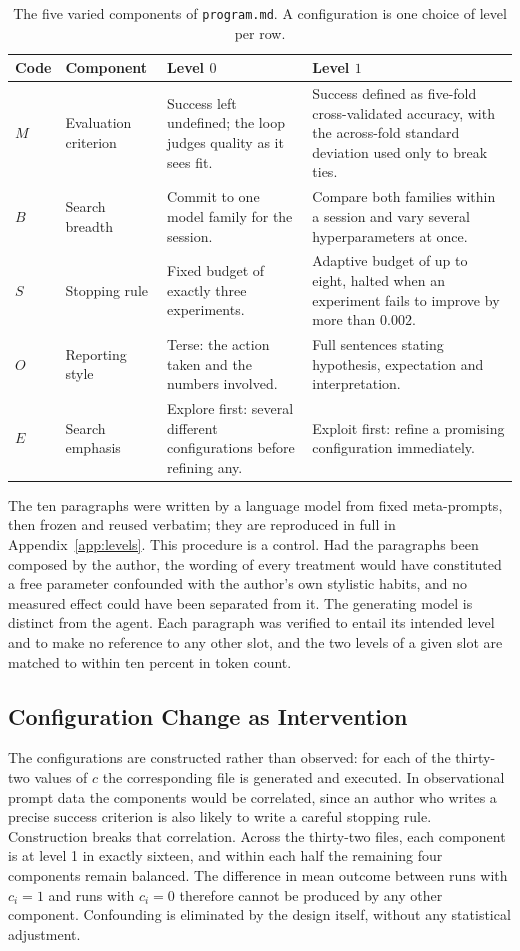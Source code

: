 \documentclass[11pt]{article}
\begin{document}
\begin{table}[t]
\centering
\small
\caption{The five varied components of \texttt{program.md}. A configuration is one choice of level per row.}
\label{tab:axes}
\begin{tabular}{p{0.8cm}p{2.1cm}p{4.6cm}p{4.6cm}}
\toprule
Code & Component & Level $0$ & Level $1$ \\
\midrule
$M$ & Evaluation criterion & Success left undefined; the loop judges quality as it sees fit. & Success defined as five-fold cross-validated accuracy, with the across-fold standard deviation used only to break ties. \\
$B$ & Search breadth & Commit to one model family for the session. & Compare both families within a session and vary several hyperparameters at once. \\
$S$ & Stopping rule & Fixed budget of exactly three experiments. & Adaptive budget of up to eight, halted when an experiment fails to improve by more than $0.002$. \\
$O$ & Reporting style & Terse: the action taken and the numbers involved. & Full sentences stating hypothesis, expectation and interpretation. \\
$E$ & Search emphasis & Explore first: several different configurations before refining any. & Exploit first: refine a promising configuration immediately. \\
\bottomrule
\end{tabular}
\end{table}

The ten paragraphs were written by a language model from fixed meta-prompts, then frozen and reused verbatim; they are reproduced in full in Appendix~\ref{app:levels}. This procedure is a control. Had the paragraphs been composed by the author, the wording of every treatment would have constituted a free parameter confounded with the author's own stylistic habits, and no measured effect could have been separated from it. The generating model is distinct from the agent. Each paragraph was verified to entail its intended level and to make no reference to any other slot, and the two levels of a given slot are matched to within ten percent in token count.

\subsection{Configuration Change as Intervention}

The configurations are constructed rather than observed: for each of the thirty-two values of $c$ the corresponding file is generated and executed. In observational prompt data the components would be correlated, since an author who writes a precise success criterion is also likely to write a careful stopping rule. Construction breaks that correlation. Across the thirty-two files, each component is at level 1 in exactly sixteen, and within each half the remaining four components remain balanced. The difference in mean outcome between runs with $c_i=1$ and runs with $c_i=0$ therefore cannot be produced by any other component. Confounding is eliminated by the design itself, without any statistical adjustment.
\end{document}
